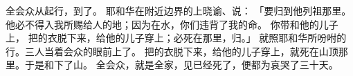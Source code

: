 {\par }{\PP {}全会众从{}起行，到了{}。
耶和华在附近{}边界的{}上晓谕{}、{}说：
「{}要归到他列祖那里。他必不得入我所赐给{}人的地；因为在{}水，你们违背了我的命。
你带{}和他的儿子{}上{}，
把{}的{}衣脱下来，给他的儿子{}穿上；{}必死在那里，归{}。」
就照耶和华所吩咐的行。三人当着会众的眼前上了{}。
把{}的{}衣脱下来，给他的儿子{}穿上，{}就死在山顶那里。于是{}和{}下了山。
全会众，就是{}全家，见{}已经死了，便都为{}哀哭了三十天。

}
